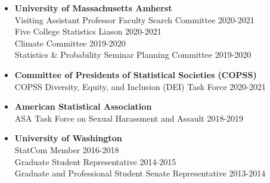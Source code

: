 \documentclass[11pt]{article}
\begin{document}
\begin{itemize} 
	\item[] \textbf{University of Massachusetts Amherst} \\ 
	Visiting Assistant Professor Faculty Search Committee \hfill 2020-2021 \\
	Five College Statistics Liason \hfill 2020-2021 \\
	Climate Committee \hfill 2019-2020 \\
	Statistics \& Probability Seminar Planning Committee \hfill 2019-2020\vspace{-2mm}
	\item[] \textbf{Committee of Presidents of Statistical Societies (COPSS)} \\ 
	COPSS Diversity, Equity, and Inclusion (DEI) Task Force \hfill 2020-2021\vspace{-2mm}
	\item[] \textbf{American Statistical Association} \\ 
	ASA Task Force on Sexual Harassment and Assault \hfill 2018-2019\vspace{-2mm}
	\item[] \textbf{University of Washington} \\
	StatCom Member \hfill 2016-2018 \\
	Graduate Student Representative \hfill 2014-2015 \\
	Graduate and Professional Student Senate Representative \hfill 2013-2014\vspace{-2mm}
\end{itemize}
\end{document}
